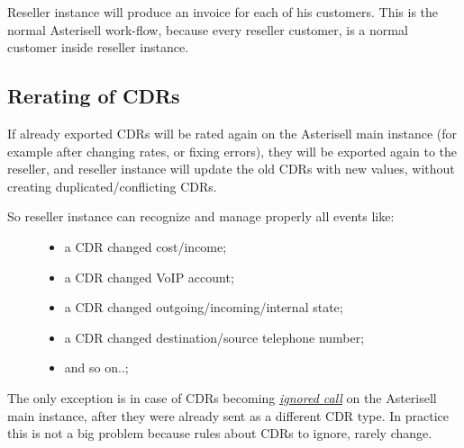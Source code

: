 \documentclass[letterpaper,10pt,english]{sphinxmanual}
\begin{document}
Reseller instance will produce an invoice for each of his customers. This is the normal Asterisell work-flow, because every reseller customer, is a normal customer inside reseller instance.


\subsection{Rerating of CDRs}
\label{index:rerating-of-cdrs}
If already exported CDRs will be rated again on the Asterisell main instance (for example after changing rates, or fixing errors), they will be exported again to the reseller, and reseller instance will update the old CDRs with new values, without creating duplicated/conflicting CDRs.
\begin{description}
\item[{So reseller instance can recognize and manage properly all events like:}] \leavevmode\begin{itemize}
\item {} 
a CDR changed cost/income;

\item {} 
a CDR changed VoIP account;

\item {} 
a CDR changed outgoing/incoming/internal state;

\item {} 
a CDR changed destination/source telephone number;

\item {} 
and so on..;

\end{itemize}

\end{description}

The only exception is in case of CDRs becoming {\hyperref[index:term-ignored-call]{\emph{ignored call}}} on the Asterisell main instance, after they were already sent as a different CDR type. In practice this is not a big problem because rules about CDRs to ignore, rarely change.
\end{document}

